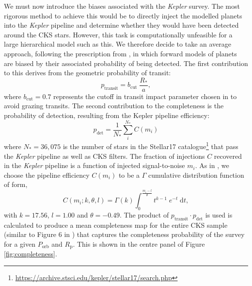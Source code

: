\documentclass[fleqn,usenatbib]{mnras}
\newcommand{\correction}{\color{black}}
\begin{document}
{\correction We must now introduce the biases associated with the \textit{Kepler} survey. The most rigorous method to achieve this would be to directly inject the modelled planets into the \textit{Kepler} pipeline and determine whether they would have been detected around the CKS stars. However, this task is computationally unfeasible for a large hierarchical model such as this. We therefore decide to take an average approach,} following the prescription from \cite{Fulton2017}, in which forward models of planets are biased by their associated probability of being detected. The first contribution to this derives from the geometric probability of transit:
\begin{equation}
    p_\text{transit} = b_\text{cut} \; \frac{R_*}{a},
\end{equation}
where $b_\text{cut}=0.7$ represents the cutoff in transit impact parameter chosen in \cite{Fulton2017} to avoid grazing transits. The second contribution to the completeness is the probability of detection, resulting from the Kepler pipeline efficiency:
\begin{equation}
    p_\text{det} = \frac{1}{N_*} \sum^{N_*}_i C(m_i)
\end{equation}
where $N_* = 36,075$ is the number of stars in the Stellar17 catalogue\footnote{\url{https://archive.stsci.edu/kepler/stellar17/search.php}} \citep{Mathur2017} that pass the \textit{Kepler} pipeline \citep{Christiansen2012,Christiansen2015,Christiansen2016} as well as CKS filters. The fraction of injections $C$ recovered in the \textit{Kepler} pipeline is a function of injected signal-to-noise $m_i$. As in \cite{Fulton2017}, we choose the pipeline efficiency $C(m_i)$ to be a $\Gamma$ cumulative distribution function of form,
\begin{equation}
    C(m_i; k,\theta,l) = \Gamma(k) \int^{\frac{m_i-l}{\theta}}_{0} t^{k-1} \; e^{-t} \; \mathrm{d} t,
\end{equation}
with $k=17.56$, $l=1.00$ and $\theta=-0.49$. The product of $p_\text{transit} \cdot p_\text{det}$ is used is calculated to produce a mean completeness map for the entire CKS sample (similar to Figure 6 in \cite{Fulton2017}) that captures the completeness probability of the survey for a given $P_\text{orb}$ and $R_\text{p}$. This is shown in the centre panel of Figure \ref{fig:completeness}.
\end{document}
